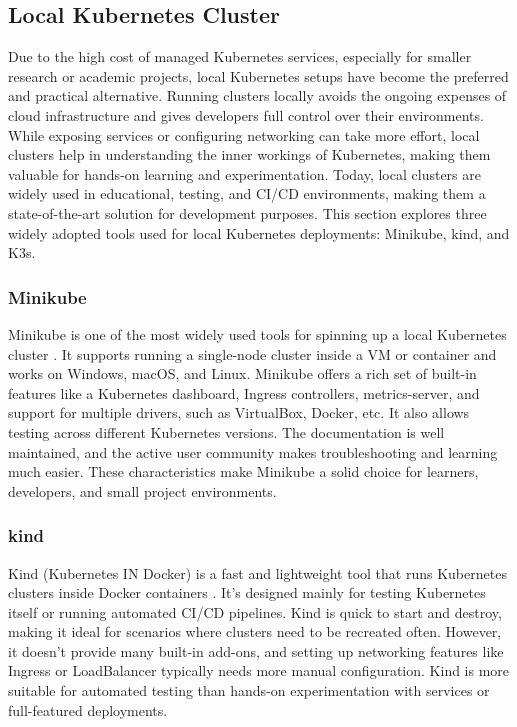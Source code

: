 \subsection{Local Kubernetes Cluster}
Due to the high cost of managed Kubernetes services, especially for smaller research or academic projects, local Kubernetes setups have become the preferred and practical alternative. Running clusters locally avoids the ongoing expenses of cloud infrastructure and gives developers full control over their environments. While exposing services or configuring networking can take more effort, local clusters help in understanding the inner workings of Kubernetes, making them valuable for hands-on learning and experimentation. Today, local clusters are widely used in educational, testing, and CI/CD environments, making them a state-of-the-art solution for development purposes. This section explores three widely adopted tools used for local Kubernetes deployments: Minikube, kind, and K3s.

\subsubsection{Minikube}
Minikube is one of the most widely used tools for spinning up a local Kubernetes cluster \cite{minikube-docs}. It supports running a single-node cluster inside a VM or container and works on Windows, macOS, and Linux. Minikube offers a rich set of built-in features like a Kubernetes dashboard, Ingress controllers, metrics-server, and support for multiple drivers, such as VirtualBox, Docker, etc. It also allows testing across different Kubernetes versions. The documentation is well maintained, and the active user community makes troubleshooting and learning much easier. These characteristics make Minikube a solid choice for learners, developers, and small project environments.

\subsubsection{kind}
Kind (Kubernetes IN Docker) is a fast and lightweight tool that runs Kubernetes clusters inside Docker containers \cite{kind-docs}. It's designed mainly for testing Kubernetes itself or running automated CI/CD pipelines. Kind is quick to start and destroy, making it ideal for scenarios where clusters need to be recreated often. However, it doesn't provide many built-in add-ons, and setting up networking features like Ingress or LoadBalancer typically needs more manual configuration. Kind is more suitable for automated testing than hands-on experimentation with services or full-featured deployments.

